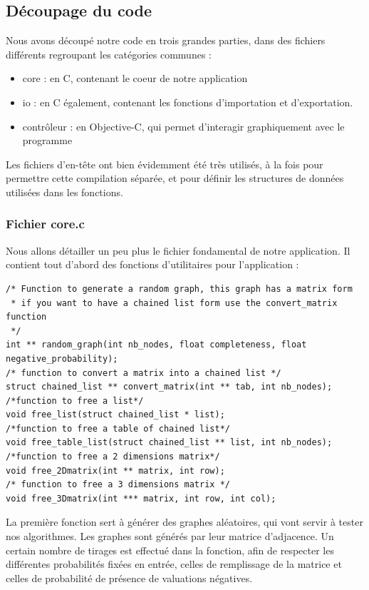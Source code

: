 \documentclass[a4paper,12pt,final] {article}
\begin{document}
\subsection{Découpage du code}

Nous avons découpé notre code en trois grandes parties, dans des fichiers différents regroupant les catégories communes :

\begin{itemize}
\item{core} : en C, contenant le coeur de notre application
\item{io} : en C également, contenant les fonctions d'importation et d'exportation.
\item{contrôleur} : en Objective-C, qui permet d'interagir graphiquement avec le programme
\end{itemize}

Les fichiers d'en-tête ont bien évidemment été très utilisés, à la fois pour permettre cette compilation séparée, et pour définir les structures de données utilisées dans les fonctions.\\

\subsubsection{Fichier core.c}

Nous allons détailler un peu plus le fichier fondamental de notre application. Il contient tout d'abord des fonctions d'utilitaires pour l'application :
\begin{lstlisting}
/* Function to generate a random graph, this graph has a matrix form
 * if you want to have a chained list form use the convert_matrix function
 */
int ** random_graph(int nb_nodes, float completeness, float negative_probability);
/* function to convert a matrix into a chained list */
struct chained_list ** convert_matrix(int ** tab, int nb_nodes);
/*function to free a list*/
void free_list(struct chained_list * list);
/*function to free a table of chained list*/
void free_table_list(struct chained_list ** list, int nb_nodes);
/*function to free a 2 dimensions matrix*/
void free_2Dmatrix(int ** matrix, int row);
/* function to free a 3 dimensions matrix */
void free_3Dmatrix(int *** matrix, int row, int col);
\end{lstlisting}

La première fonction sert à générer des graphes aléatoires, qui vont servir à tester nos algorithmes. Les graphes sont générés par leur matrice d'adjacence. Un certain nombre de tirages est effectué dans la fonction, afin de respecter les différentes probabilités fixées en entrée, celles de remplissage de la matrice et celles de probabilité de présence de valuations négatives.\\
\end{document}
